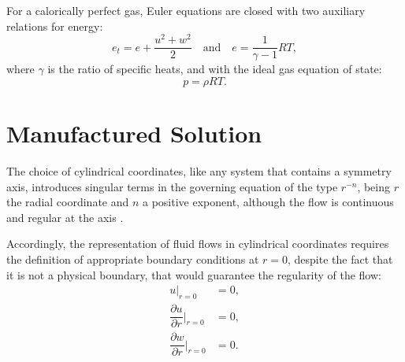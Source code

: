 \documentclass[a4paper,10pt]{article}
\newcommand{\diff}[2] {\dfrac{\partial #1}{\partial #2}}
\begin{document}
\begin{landscape}
For a calorically perfect gas, Euler equations are closed with two auxiliary relations for energy:
\begin{equation}
 \label{eq:ns2d_05}
e_t= e+\dfrac{u^2+w^2}{2} \quad \mbox{and}\quad e=\dfrac{1}{\gamma -1}RT ,
\end{equation}
where $\gamma$ is the ratio of specific heats, and with the ideal gas equation of state:
\begin{equation}
 \label{eq:ns2d_07}
p=\rho RT.
\end{equation}

\section{Manufactured Solution}

The choice of cylindrical coordinates, like any system that contains a symmetry axis, introduces singular terms in the governing equation of the type $r^{-n}$, being $r$ the radial coordinate and $n$ a positive exponent, %
 although the flow is continuous and regular at the axis \cite{Domenichini2004}.


Accordingly, the representation of fluid flows in cylindrical coordinates requires the definition of appropriate boundary conditions at $r=0$, despite the fact that it is not a physical boundary, that would guarantee the regularity of the flow: %
\begin{equation}
\label{cc}
\begin{split}
u \big| _{r=0} &=0,\\
 \diff{u}{r}\Big| _{r=0} &=0,\\
\diff{w}{r}\Big| _{r=0} &=0.\\
\end{split}
\end{equation}


\end{landscape}
\end{document}
